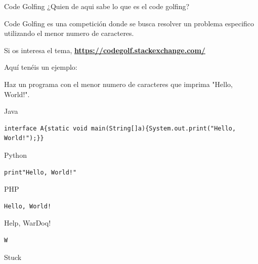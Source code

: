 \documentclass{beamer}
\begin{document}
    \begin{frame}{Code Golfing}
¿Quien de aqui sabe lo que es el code golfing? \pause

Code Golfing es una competición donde se busca resolver un problema especifico utilizando el menor numero de caracteres. 

Si os interesa el tema, \textbf{\hyperlink{https://codegolf.stackexchange.com/}{https://codegolf.stackexchange.com/}} 

Aquí tenéis un ejemplo:

Haz un programa con el menor numero de caracteres que imprima "Hello, World!".
\end{frame}
\begin{frame}[fragile]{Java}
\begin{lstlisting}
interface A{static void main(String[]a){System.out.print("Hello, World!");}}
\end{lstlisting}
\end{frame}

\begin{frame}[fragile]{Python}
\begin{lstlisting}
print"Hello, World!"
\end{lstlisting}
\end{frame}

\begin{frame}[fragile]{PHP}
\begin{lstlisting}
Hello, World!
\end{lstlisting}
\end{frame}

\begin{frame}[fragile]{Help, WarDoq!}
\begin{lstlisting}
W
\end{lstlisting}
\end{frame}

\begin{frame}{Stuck}

   			 		   		  	 
    
		    	  	   
	
     		  	 	
	
     		 		  
 
 	
  	
     		 				
	
     	     
	
     	 	 			
	
     		 				
	
     			  	 
	
     		 		  
	
     		  	  
	
     	    	
	
     	 	 
	
   



\end{frame}
\end{document}
